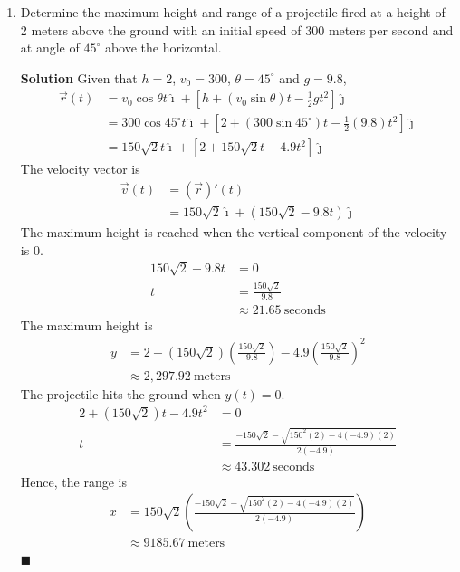 \documentclass{report}
\begin{document}
\begin{enumerate}
    \item Determine the maximum height and range of a projectile fired at a height of 2
          meters above the ground with an initial speed of 300 meters per second and at
          angle of $45^{\circ}$ above the horizontal.

          \textbf{Solution} Given that $h = 2$, $v_0 = 300$, $\theta = 45^{\circ}$ and $g = 9.8$,
          \begin{align*}
              \vec{r}(t) & = v_0\cos\theta t\hat{\imath} + \left[h + (v_0\sin\theta) t - \frac{1}{2}gt^2\right]\hat{\jmath}                 \\
                         & = 300\cos{45^{\circ}} t\hat{\imath} + \left[2 + (300\sin{45^{\circ}}) t - \frac{1}{2}(9.8)t^2\right]\hat{\jmath} \\
                         & = 150\sqrt{2} t\hat{\imath} + \left[2 + 150\sqrt{2} t - 4.9t^2\right]\hat{\jmath}
          \end{align*}
          The velocity vector is
          \begin{align*}
              \vec{v}(t) & = (\vec{r})'(t)                                              \\
                         & = 150\sqrt{2}\hat{\imath} + (150\sqrt{2} - 9.8t)\hat{\jmath}
          \end{align*}
          The maximum height is reached when the vertical component of the velocity is $0$.
          \begin{align*}
              150\sqrt{2} - 9.8t & = 0                           \\
              t                  & = \frac{150\sqrt{2}}{9.8}     \\
                                 & \approx 21.65\ \text{seconds}
          \end{align*}
          The maximum height is
          \begin{align*}
              y & = 2 + (150\sqrt{2})\left(\frac{150\sqrt{2}}{9.8}\right) - 4.9\left(\frac{150\sqrt{2}}{9.8}\right)^2 \\
                & \approx 2,297.92\ \text{meters}
          \end{align*}
          The projectile hits the ground when $y(t) = 0$.
          \begin{align*}
              2 + (150\sqrt{2}) t - 4.9t^2 & = 0                                                           \\
              t                            & = \frac{-150\sqrt{2} - \sqrt{150^2(2) - 4(-4.9)(2)}}{2(-4.9)} \\
                                           & \approx 43.302\ \text{seconds}
          \end{align*}
          Hence, the range is
          \begin{align*}
              x & = 150\sqrt{2} \left(\frac{-150\sqrt{2} - \sqrt{150^2(2) - 4(-4.9)(2)}}{2(-4.9)}\right) \\
                & \approx 9185.67\ \text{meters}
          \end{align*} \hfill$\blacksquare$


\end{enumerate}
\end{document}
